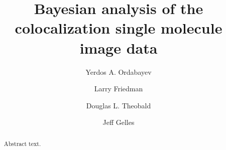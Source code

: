 \documentclass[10pt, letterpaper]{article}
\title{Bayesian analysis of the colocalization single molecule image data}
\author[1]{Yerdos A. Ordabayev}
\author[2]{Larry Friedman}
\author[3]{Douglas L. Theobald}
\author[4]{Jeff Gelles}
\affil[1]{Brandeis University}
\begin{document}
\maketitle

\begin{abstract}
Abstract text.
\end{abstract}





%



%

%

%

%
\end{document}
